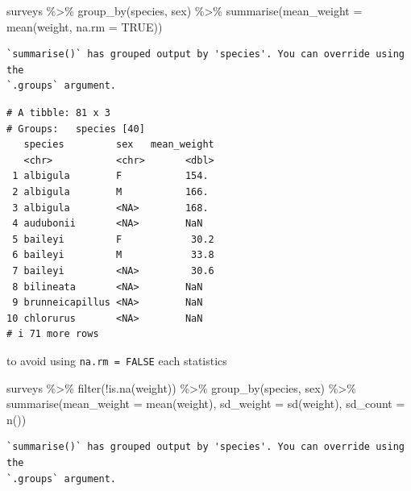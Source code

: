 \documentclass[
  letterpaper,
  DIV=11,
  numbers=noendperiod]{scrreprt}
\newenvironment{Shaded}{\begin{snugshade}}{\end{snugshade}}
\newcommand{\AttributeTok}[1]{\textcolor[rgb]{0.40,0.45,0.13}{#1}}
\newcommand{\ConstantTok}[1]{\textcolor[rgb]{0.56,0.35,0.01}{#1}}
\newcommand{\FunctionTok}[1]{\textcolor[rgb]{0.28,0.35,0.67}{#1}}
\newcommand{\NormalTok}[1]{\textcolor[rgb]{0.00,0.23,0.31}{#1}}
\newcommand{\SpecialCharTok}[1]{\textcolor[rgb]{0.37,0.37,0.37}{#1}}
\begin{document}
\begin{Shaded}
\begin{Highlighting}[]
\NormalTok{surveys }\SpecialCharTok{\%\textgreater{}\%}
    \FunctionTok{group\_by}\NormalTok{(species, sex) }\SpecialCharTok{\%\textgreater{}\%}
    \FunctionTok{summarise}\NormalTok{(}\AttributeTok{mean\_weight =} \FunctionTok{mean}\NormalTok{(weight, }\AttributeTok{na.rm =} \ConstantTok{TRUE}\NormalTok{))}
\end{Highlighting}
\end{Shaded}

\begin{verbatim}
`summarise()` has grouped output by 'species'. You can override using the
`.groups` argument.
\end{verbatim}

\begin{verbatim}
# A tibble: 81 x 3
# Groups:   species [40]
   species         sex   mean_weight
   <chr>           <chr>       <dbl>
 1 albigula        F           154. 
 2 albigula        M           166. 
 3 albigula        <NA>        168. 
 4 audubonii       <NA>        NaN  
 5 baileyi         F            30.2
 6 baileyi         M            33.8
 7 baileyi         <NA>         30.6
 8 bilineata       <NA>        NaN  
 9 brunneicapillus <NA>        NaN  
10 chlorurus       <NA>        NaN  
# i 71 more rows
\end{verbatim}

to avoid using \texttt{na.rm\ =\ FALSE} each statistics

\begin{Shaded}
\begin{Highlighting}[]
\NormalTok{surveys }\SpecialCharTok{\%\textgreater{}\%}
    \FunctionTok{filter}\NormalTok{(}\SpecialCharTok{!}\FunctionTok{is.na}\NormalTok{(weight)) }\SpecialCharTok{\%\textgreater{}\%}
    \FunctionTok{group\_by}\NormalTok{(species, sex) }\SpecialCharTok{\%\textgreater{}\%}
    \FunctionTok{summarise}\NormalTok{(}\AttributeTok{mean\_weight =} \FunctionTok{mean}\NormalTok{(weight), }\AttributeTok{sd\_weight =} \FunctionTok{sd}\NormalTok{(weight), }\AttributeTok{sd\_count =} \FunctionTok{n}\NormalTok{())}
\end{Highlighting}
\end{Shaded}

\begin{verbatim}
`summarise()` has grouped output by 'species'. You can override using the
`.groups` argument.
\end{verbatim}
\end{document}
